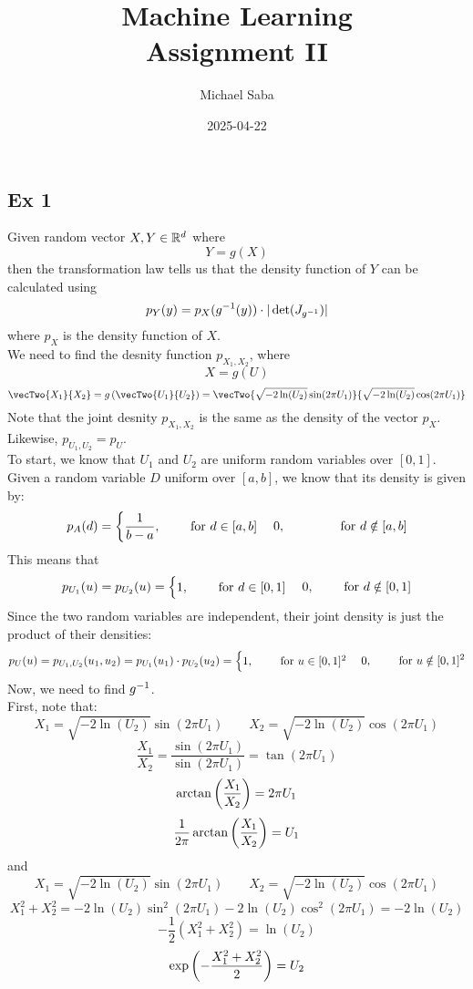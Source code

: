 \documentclass[12pt]{article}
\title{%
    \Huge Machine Learning \\
    \Large Assignment II
}
\date{2025-04-22}
\author{Michael Saba}
\begin{document}
\maketitle
\newpage
\setlength{\parindent}{0pt}

\subsection*{Ex 1}

Given random vector $X, Y \in \mathbb{R}^d$ where
\[ Y = g(X) \]
then the transformation law tells us that
the density function of $Y$ can be calculated
using
\[ p_Y(y) = p_X(g^{-1} (y)) \cdot 
| \det(J_{g^{-1}}) | \]
where $p_X$ is the density function of $X$. \\
We need to find the desnity function $p_{X_1, X_2}$,
where
\[ X = g(U) \]
\[ \vecTwo{X_1}{X_2} = g\para{\vecTwo{U_1}{U_2}}
= \vecTwo
{\sqrt{-2\ln(U_2)}\sin(2\pi U_1) \vspace{10pt}}
{\sqrt{-2\ln(U_2)}\cos(2\pi U_1)}\]
Note that the joint desnity $p_{X_1, X_2}$
is the same as the density of the vector $p_X$.
Likewise, $p_{U_1, U_2} = p_U$. \\ 
To start, we know that $U_1$ and $U_2$
are uniform random variables over $[0, 1]$. \\
Given a random variable $D$ uniform over $[a, b]$,
we know that its density is given by:
\[ p_A(d) = \begin{cases} \dfrac{1}{b-a},
\qquad \text{ for } d \in [a, b] \end{cases}
{ 0, \qquad \qquad \text{ for } d \notin [a, b]} \]
This means that 
\[ p_{U_1}(u) = p_{U_2}(u) = 
\begin{cases} 1, \qquad \text{ for } d \in [0, 1] \end{cases}
{ 0, \qquad \text{ for } d \notin [0, 1]} \]
Since the two random variables are independent,
their joint density is just the product
of their densities:
\[ p_U(u) = p_{U_1, U_2}(u_1, u_2) =
p_{U_1}(u_1) \cdot p_{U_2}(u_2) = 
\begin{cases} 1, \qquad \text{ for } u \in [0, 1]^2 \end{cases}
{ 0, \qquad \text{ for } u \notin [0, 1]^2} \]
Now, we need to find $g^{-1}$. \\
First, note that:
\[ X_1 = \sqrt{-2\ln(U_2)}\sin(2\pi U_1)
\qquad X_2 = \sqrt{-2\ln(U_2)}\cos(2\pi U_1) \]
\[ \dfrac{X_1}{X_2} = 
\dfrac{\sin(2\pi U_1)}{\sin(2\pi U_1)}
= \tan(2\pi U_1) \]
\[ \arctan\left( \dfrac{X_1}{X_2} \right) = 2\pi U_1 \]
\[ \dfrac{1}{2\pi}\arctan\left( \dfrac{X_1}{X_2} \right) 
= U_1 \]
and
\[ X_1 = \sqrt{-2\ln(U_2)}\sin(2\pi U_1)
\qquad X_2 = \sqrt{-2\ln(U_2)}\cos(2\pi U_1) \]
\[ X_1^2 + X_2^2 = 
-2\ln(U_2)\sin^2(2\pi U_1) 
-2\ln(U_2)\cos^2(2\pi U_1)
= -2\ln(U_2) \]
\[ -\dfrac{1}{2}(X_1^2 + X_2^2) = \ln(U_2) \]
\[ \exp\left( -\dfrac{X_1^2 + X_2^2}{2} \right) = U_2 \]
\end{document}
